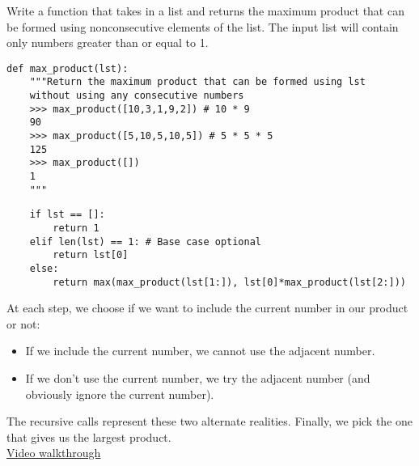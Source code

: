 \question
Write a function that takes in a list and returns the maximum product that
can be formed using nonconsecutive elements of the list. The input list
will contain only numbers greater than or equal to 1.

\begin{lstlisting}
def max_product(lst):
    """Return the maximum product that can be formed using lst
    without using any consecutive numbers
    >>> max_product([10,3,1,9,2]) # 10 * 9
    90
    >>> max_product([5,10,5,10,5]) # 5 * 5 * 5
    125
    >>> max_product([])
    1
    """
\end{lstlisting}
\begin{solution}[2in]
\begin{lstlisting}
    if lst == []:
        return 1
    elif len(lst) == 1: # Base case optional
        return lst[0]
    else:
        return max(max_product(lst[1:]), lst[0]*max_product(lst[2:]))
\end{lstlisting}
At each step, we choose if we want to include the current number in our product
or not:
\begin{itemize}
    \item If we include the current number, we cannot use the adjacent number.
    \item If we don't use the current number, we try the adjacent number (and
        obviously ignore the current number).
\end{itemize}
The recursive calls represent these two alternate realities. Finally, we pick
the one that gives us the largest product.\\
\href{https://www.youtube.com/watch?v=Am6m8YgAnYY&list=PLx38hZJ5RLZdJgRCgpaTbmRXKAHOUmomO&index=4&t=3m0s}{Video walkthrough}
\end{solution}
